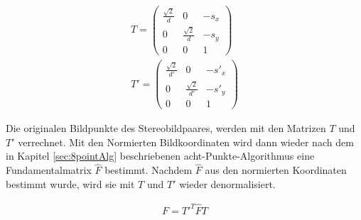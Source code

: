 \begin{gather}
	T = \begin{pmatrix}
		\frac{\sqrt{2}}{d}&0&-s_x\\
		0&\frac{\sqrt{2}}{d}&-s_y\\
		0&0&1
	\end{pmatrix}\\
	T' = \begin{pmatrix}
	\frac{\sqrt{2}}{d'}&0&-s'_x\\
	0&\frac{\sqrt{2}}{d'}&-s'_y\\
	0&0&1
\end{pmatrix}
\end{gather}

Die originalen Bildpunkte des Stereobildpaares, werden mit den Matrizen $T$ und $T'$ verrechnet. Mit den Normierten Bildkoordinaten wird dann wieder nach dem in Kapitel \ref{sec:8pointAlg} beschriebenen acht-Punkte-Algorithmus eine Fundamentalmatrix $\hat{F}$ bestimmt\cite{HZ,HZ8,Ferid,Brooks}. Nachdem $\hat{F}$ aus den normierten Koordinaten bestimmt wurde, wird sie mit $T$ und $T'$ wieder denormalisiert.

\begin{gather}
	F = T'^T\hat{F}T
\end{gather}


%

%



